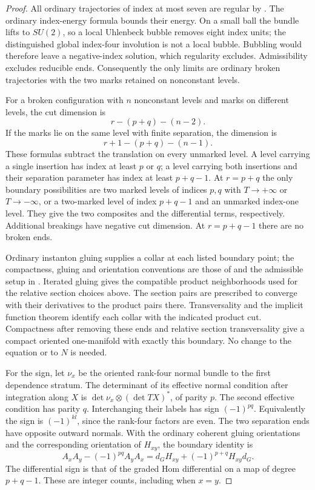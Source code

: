 \documentclass[11pt]{amsart}
\theoremstyle{definition}
\theoremstyle{remark}
\theoremstyle{plain}
\begin{document}
\begin{proof}
All ordinary trajectories of index at most seven
are regular by \cite[Lemma~2.56]{DaeFukLip21a}.
The ordinary index-energy formula bounds their
energy. On a small ball the bundle lifts to $SU(2)$,
so a local Uhlenbeck bubble removes eight index
units; the distinguished global index-four
involution is not a local bubble. Bubbling
would therefore leave a negative-index solution,
which regularity excludes. Admissibility excludes
reducible ends. Consequently the only limits
are ordinary broken trajectories with the two
marks retained on nonconstant levels.

For a broken configuration with $n$ nonconstant
levels and marks on different levels, the cut
dimension is
\[
                         r-(p+q)-(n-2).
\]
If the marks lie on the same level with finite
separation, the dimension is
\[
                         r+1-(p+q)-(n-1).
\]
These formulas subtract the translation on every
unmarked level. A level carrying a single insertion
has index at least $p$ or $q$; a level carrying
both insertions and their separation parameter
has index at least $p+q-1$.
At $r=p+q$ the only boundary possibilities are
two marked levels of indices $p,q$ with
$T\to+\infty$ or $T\to-\infty$, or a two-marked
level of index $p+q-1$ and an unmarked index-one
level. They give the two composites and the
differential terms, respectively. Additional
breakings have negative cut dimension.
At $r=p+q-1$ there are no broken ends.

Ordinary instanton gluing supplies a collar at each listed
boundary point; the compactness, gluing and orientation
conventions are those of
\cite[Theorem~4.17, Proposition~5.11 and
Sections~5.1, 5.4--5.6]{Donaldson02}
and the admissible setup in \cite[Section~2.4]{DaeFukLip21a}.
Iterated gluing gives the compatible product neighborhoods
used for the relative section choices above.
The section pairs are prescribed
to converge with their derivatives to the product
pairs there. Transversality and the implicit
function theorem identify each collar with
the indicated product cut. Compactness after
removing these ends and relative section
transversality give a compact oriented
one-manifold with exactly this boundary.
No change to the equation or to $N$ is needed.

For the sign, let $\nu_x$ be the oriented rank-four
normal bundle to the first dependence stratum.
The determinant of its effective normal condition
after integration along $X$ is
$\det\nu_x\otimes(\det TX)^*$, of parity $p$.
The second effective condition has parity $q$.
Interchanging their labels has sign $(-1)^{pq}$.
Equivalently the sign is $(-1)^{kl}$, since
the rank-four factors are even. The two separation
ends have opposite outward normals. With the
ordinary coherent gluing orientations and the
corresponding orientation of $H_{xy}$, the
boundary identity is
\begin{equation}\label{eq:ordinary-integral-commutator}
 A_xA_y-(-1)^{pq}A_yA_x
     =d_GH_{xy}+(-1)^{p+q}H_{xy}d_G.
\end{equation}
The differential sign is that of the graded
Hom differential on a map of degree $p+q-1$.
These are integer counts, including when $x=y$.


\end{proof}
\end{document}
